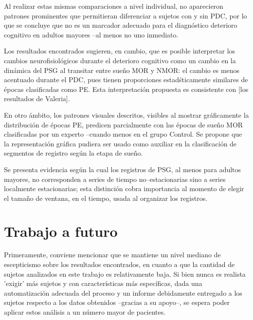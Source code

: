 \documentclass[12pt,a4paper]{mitthesis}
\begin{document}
Al realizar estas mismas comparaciones a nivel individual, no aparecieron patrones prominentes que 
permitieran diferenciar a sujetos con y sin PDC, por lo que se concluye que no es un marcador 
adecuado para el diagn\'ostico deterioro cognitivo en adultos mayores --al menos no uno inmediato.

Los resultados encontrados sugieren, en cambio, que es posible interpretar los cambios 
neurofisiol\'ogicos durante el deterioro cognitivo como un cambio en la din\'amica del PSG al 
transitar entre sue\~no MOR y NMOR: el cambio es menos acentuado durante el PDC, pues tienen 
proporciones estad\'sticamente similares de \'epocas clasificadas como PE.
Esta interpretaci\'on propuesta es consistente con [los resultados de Valeria].

En otro \'ambito, los patrones visuales descritos, visibles al mostrar gr\'aficamente la 
distribuci\'on de \'epocas PE, predicen parcialmente con las \'epocas de sue\~no MOR clasificadas 
por un experto --cuando menos en el grupo Control.
Se propone que la representaci\'on gr\'afica pudiera ser usado como auxiliar en la clasificaci\'on 
de segmentos de registro seg\'un la etapa de sue\~no.

Se presenta evidencia seg\'un la cual los registros de PSG, al menos para adultos mayores, no 
corresponden a series de tiempo no--estacionarias sino a series localmente estacionarias; esta 
distinci\'on cobra importancia al momento de elegir el tama\~no de ventana, en el tiempo, usada al 
organizar los registros.


\section{Trabajo a futuro}

Primeramente, conviene mencionar que se mantiene un nivel mediano de escepticismo sobre los 
resultados encontrados, en cuanto a que la cantidad de sujetos analizados en este trabajo es 
relativamente baja. Si bien nunca es realista 'exigir' m\'as sujetos y con caracter\'isticas m\'as 
espec\'ificas, dada una automatizaci\'on adecuada del proceso y un informe debidamente entregado a 
los sujetos respecto a los datos obtenidos --gracias a su apoyo--, se espera poder aplicar estos 
an\'alisis a un n\'umero mayor de pacientes.
\end{document}

